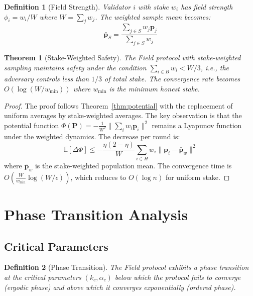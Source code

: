 \documentclass[11pt,a4paper]{article}
\newtheorem{theorem}{Theorem}[section]
\newtheorem{definition}{Definition}[section]
\begin{document}
\begin{definition}[Field Strength]
Validator $i$ with stake $w_i$ has field strength $\phi_i = w_i / W$ where $W = \sum_j w_j$.
The weighted sample mean becomes:
\[
\bar{\mathbf{p}}_S = \frac{\sum_{j \in S} w_j \mathbf{p}_j}{\sum_{j \in S} w_j}
\]
\end{definition}

\begin{theorem}[Stake-Weighted Safety]
\label{thm:stake}
The Field protocol with stake-weighted sampling maintains safety under the condition
$\sum_{i \in B} w_i < W/3$, i.e., the adversary controls less than $1/3$ of total stake.
The convergence rate becomes $O(\log(W/w_{\min}))$ where $w_{\min}$ is the minimum
honest stake.
\end{theorem}

\begin{proof}
The proof follows Theorem~\ref{thm:potential} with the replacement of uniform averages
by stake-weighted averages. The key observation is that the potential function
$\Phi(\mathbf{P}) = -\frac{1}{W^2}\|\sum_i w_i \mathbf{p}_i\|^2$ remains a Lyapunov
function under the weighted dynamics. The decrease per round is:
\[
\mathbb{E}[\Delta \Phi] \leq -\frac{\eta(2-\eta)}{W} \sum_{i \in H} w_i \|\mathbf{p}_i - \bar{\mathbf{p}}_w\|^2
\]
where $\bar{\mathbf{p}}_w$ is the stake-weighted population mean. The convergence time
is $O(\frac{W}{w_{\min}} \log(W/\epsilon))$, which reduces to $O(\log n)$ for uniform stake.
\end{proof}

\section{Phase Transition Analysis}
\label{sec:phase}

\subsection{Critical Parameters}

\begin{definition}[Phase Transition]
The Field protocol exhibits a phase transition at the critical parameters
$(k_c, \alpha_c)$ below which the protocol fails to converge (ergodic phase) and
above which it converges exponentially (ordered phase).
\end{definition}
\end{document}

